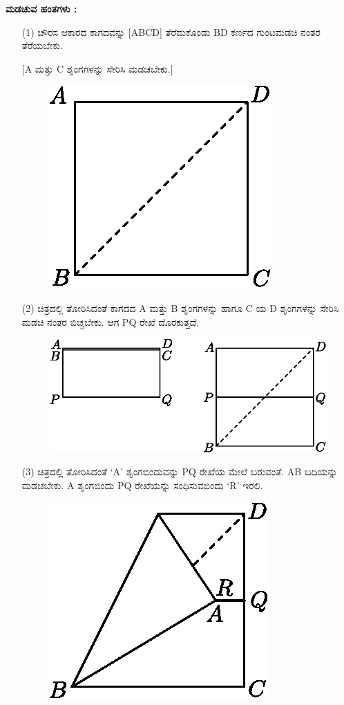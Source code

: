 \noindent
\textbf{ಮಡಚುವ ಹಂತಗಳು :}
\begin{itemize}
\item[(1)] ಚೌರಸ ಆಕಾರದ ಕಾಗದವನ್ನು [ABCD] ತೆರೆದುಕೊಂಡು BD ಕರ್ಣದ ಗುಂಟ\break ಮಡಚಿ ನಂತರ ತೆರೆಯಬೇಕು. 

[A ಮತ್ತು C ಶೃಂಗಗಳನ್ನು ಸೇರಿಸಿ ಮಡಚಬೇಕು.]
\begin{figure}[H]
\centering
\includegraphics[scale=.98]{src/figure/chap1/fig1-10a.eps}
\end{figure}

\item[(2)] ಚಿತ್ರದಲ್ಲಿ ತೋರಿಸಿದಂತೆ ಕಾಗದದ A ಮತ್ತು  B ಶೃಂಗಗಳನ್ನು ಹಾಗೂ  C ಯ D ಶೃಂಗಗಳನ್ನು ಸೇರಿಸಿ ಮಡಚಿ ನಂತರ ಬಿಚ್ಚಬೇಕು. ಆಗ PQ ರೇಖೆ ದೊರಕುತ್ತದೆ. 
\begin{figure}[H]
\centering
\includegraphics[scale=.98]{src/figure/chap1/fig1-10b.eps}
\end{figure}

\item[(3)] ಚಿತ್ರದಲ್ಲಿ ತೋರಿಸಿದಂತೆ  `A' ಶೃಂಗಬಿಂದುವನ್ನು PQ ರೇಖೆಯ ಮೇಲೆ ಬರುವಂತೆ.  AB ಬದಿಯನ್ನು ಮಡಚಬೇಕು.  A ಶೃಂಗಬಿಂದು  PQ ರೇಖೆಯನ್ನು ಸಂಧಿಸುವ\break ಬಿಂದು   `R' ಇರಲಿ. 
\begin{figure}[H]
\centering
\includegraphics[scale=.98]{src/figure/chap1/fig1-10c.eps}
\end{figure}


\end{itemize}
